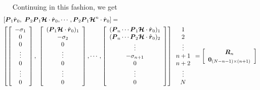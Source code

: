 \begin{figure}
{\begin{minipage} {140.0mm}
$\quad$ Continuing in this fashion, we get
\begin{eqnarray} \label{PKn}
\lefteqn{\left[{ {\bmi P}_{1}\hat{\bmi  r}_{0},\ {\bmi P}_{2}{\bmi 
P}_{1}{\CB H} \cdot \hat{\bmi  r}{}_{ 0} ,\cdots 
,{\bmi P}_{2}{\bmi P}_{1}{\CB H}^{n} \cdot \hat{\bmi  r}{}_{ 0}}\right]=}\\
&&\!\!\!\!\!\!
\left[{ 
\left[\begin{array}{c}
-{\sigma}_{1}\\0\\0\\ \vdots\\ 0 \\ \vdots \\ 0 \end{array}\right],\ 
\left[\begin{array}{c}
({\bmi P}_{1}{\CB H} \cdot \hat{\bmi  r}_{ 0})_{1}\\-{\sigma}_{2}\\0\\ 
\vdots\\ 0 \\ \vdots \\ 0 \end{array}\right] ,\cdots, 
\left[\begin{array}{c}
({\bmi P}_{n}\cdots{\bmi P}_{1}{\CB H} \cdot \hat{\bmi  r}_{ 0})_{1}\\
({\bmi P}_{n}\cdots{\bmi P}_{2}{\CB H} \cdot \hat{\bmi  r}_{ 0})_{2}\\
\vdots\\ -{\sigma}_{n+1}\\ 0 \\ \vdots \\ 0 \end{array}\right] }\right]
\begin{array}{c}1 \\ 2 \\ \vdots \\ {n+1}\\ n+2 \\ \vdots \\ N \end{array}
= \left[ \begin{array}{c} {\bmi R}_{n} \\ {\bf 0}_{(N-n-1) \times 
(n+1)}\end{array}  \right] \nonumber
\end{eqnarray}

\vspace{2 mm}
\end{minipage}
}
\end{figure}

